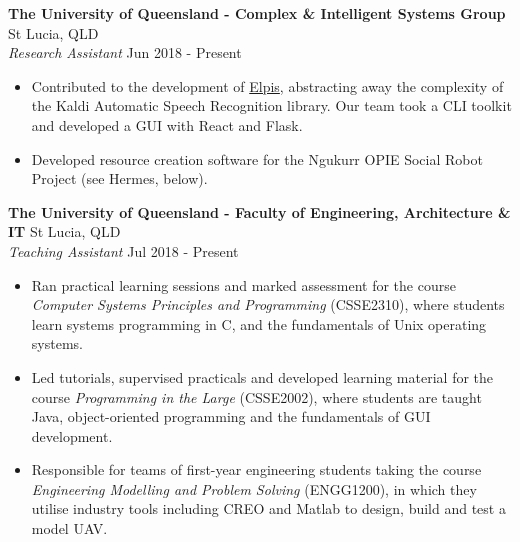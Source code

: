 \documentclass[a4paper]{article}
\newenvironment{myitemize}
{   \small
    \vspace{-2pt}
    \begin{itemize}
    \setlength{\itemsep}{0pt}
    \setlength{\parskip}{0pt}
    \setlength{\parsep}{0pt}     }
{ \end{itemize}                  }
\begin{document}
\textbf{The University of Queensland - Complex \& Intelligent Systems Group} \hfill St Lucia, QLD\\
\textit{Research Assistant} \hfill Jun 2018 - Present\\
\begin{myitemize} \itemsep 0.5mm
	\item Contributed to the development of \href{https://github.com/CoEDL/elpis}{Elpis}, abstracting away the complexity of the Kaldi Automatic Speech Recognition library. Our team took a CLI toolkit and developed a GUI with React and Flask.
	\item Developed resource creation software for the Ngukurr OPIE Social Robot Project (see Hermes, below). 
	
\end{myitemize}
\textbf{The University of Queensland - Faculty of Engineering, Architecture \& IT} \hfill St Lucia, QLD\\
\textit{Teaching Assistant} \hfill Jul 2018 - Present\\
\vspace{-0.5mm}
\begin{myitemize} \itemsep 0.5mm
	\item Ran practical learning sessions and marked assessment for the course \textit{Computer Systems Principles and Programming} (CSSE2310),  where students learn systems programming in C, and the fundamentals of Unix operating systems.
	\item Led tutorials, supervised practicals and developed learning material for the course \textit{Programming in the Large} (CSSE2002), where students are taught Java, object-oriented programming and the fundamentals of GUI development.
	\item Responsible for teams of first-year engineering students taking the course \textit{Engineering Modelling and Problem Solving} (ENGG1200), in which they utilise industry tools including CREO and Matlab to design, build and test a model UAV.
\end{myitemize}
\end{document}
